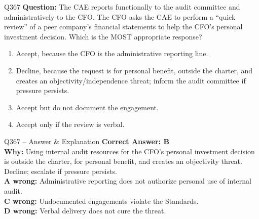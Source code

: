 \documentclass[aspectratio=169,10pt]{beamer}
\begin{document}
	\begin{frame}[t]{Q367}
		\small
		\textbf{Question:} The CAE reports functionally to the audit committee and administratively to the CFO. The CFO asks the CAE to perform a ``quick review'' of a peer company's financial statements to help the CFO's personal investment decision. Which is the MOST appropriate response?
		\begin{enumerate}[label=\Alph*.,itemsep=1pt,topsep=2pt]
			\item Accept, because the CFO is the administrative reporting line.
			\item Decline, because the request is for personal benefit, outside the charter, and creates an objectivity/independence threat; inform the audit committee if pressure persists.
			\item Accept but do not document the engagement.
			\item Accept only if the review is verbal.
		\end{enumerate}
	\end{frame}
	
	\begin{frame}[t]{Q367 -- Answer \& Explanation}
		\small
		\textbf{Correct Answer: B} \\[4pt]
		\textbf{Why:} Using internal audit resources for the CFO's personal investment decision is outside the charter, for personal benefit, and creates an objectivity threat. Decline; escalate if pressure persists. \\[4pt]
		\textbf{A wrong:} Administrative reporting does not authorize personal use of internal audit. \\[2pt]
		\textbf{C wrong:} Undocumented engagements violate the Standards. \\[2pt]
		\textbf{D wrong:} Verbal delivery does not cure the threat.
	\end{frame}
	
\end{document}
